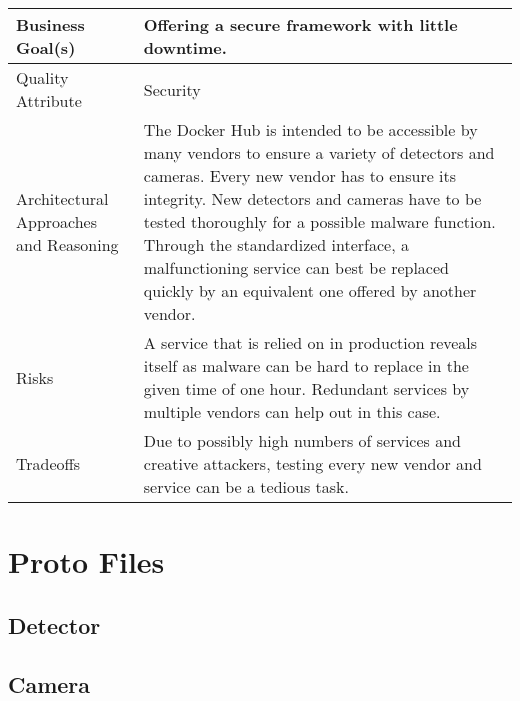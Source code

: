 {\begin{longtable}{| P{0.2\textwidth} | P{0.74\textwidth} |}
Business Goal(s) & Offering a secure framework with little downtime. \\ \hline
Quality Attribute & Security\\ \hline
Architectural Approaches and Reasoning & The Docker Hub is intended to be accessible by many vendors to ensure a variety of detectors and cameras. Every new vendor has to ensure its integrity. New detectors and cameras have to be tested thoroughly for a possible malware function. Through the standardized interface, a malfunctioning service can best be replaced quickly by an equivalent one offered by another vendor.\\ \hline
Risks &  A service that is relied on in production reveals itself as malware can be hard to replace in the given time of one hour. Redundant services by multiple vendors can help out in this case.\\ \hline
Tradeoffs & Due to possibly high numbers of services and creative attackers, testing every new vendor and service can be a tedious task.\\ \hline
\end{longtable}
}

\chapter{Proto Files}
\label{proto}
\section{Detector}


\section{Camera}


\endinput
